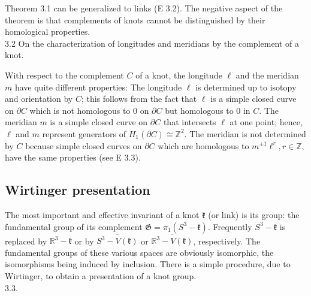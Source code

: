 \documentclass[10pt, letterpaper]{article}
\begin{document}
Theorem 3.1 can be generalized to links (E 3.2). The negative aspect of the theorem is that complements of knots cannot be distinguished by their homological properties.\\



3.2 On the characterization of longitudes and meridians by the complement of a knot. 

With respect to the complement $C$ of a knot, the longitude $\ell$ and the meridian $m$ have quite different properties: The longitude $\ell$ is determined up to isotopy and orientation by $C$; this follows from the fact that $\ell$ is a simple closed curve on $\partial C$ which is not homologous to 0 on $\partial C$ but homologous to 0 in $C$. The meridian $m$ is a simple closed curve on $\partial C$ that intersects $\ell$ at one point; hence, $\ell$ and $m$ represent generators of $H_{1}(\partial C) \cong \mathbb{Z}^{2}$. The meridian is not determined by $C$ because simple closed curves on $\partial C$ which are homologous to $m^{ \pm 1} \ell^{r}, r \in \mathbb{Z}$, have the same properties (see E 3.3).



\pagebreak

\subsection{Wirtinger presentation}

The most important and effective invariant of a knot $\mathfrak{k}$ (or link) is its group: the fundamental group of its complement $\mathfrak{G}=\pi_{1}\left(S^{3}-\mathfrak{k}\right)$. Frequently $S^{3}-\mathfrak{k}$ is replaced by $\mathbb{R}^{3}-\mathfrak{k}$ or by $\overline{S^{3}-V(\mathfrak{k})}$ or $\overline{\mathbb{R}^{3}-V(\mathfrak{k})}$, respectively. The fundamental groups of these various spaces are obviously isomorphic, the isomorphisms being induced by inclusion. There is a simple procedure, due to Wirtinger, to obtain a presentation of a knot group.\\

3.3. 
\end{document}
